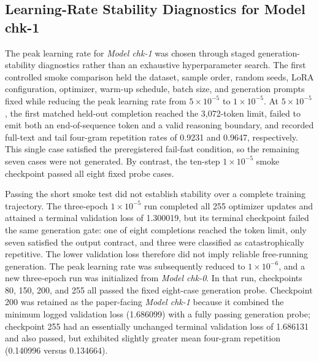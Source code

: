\subsection*{Learning-Rate Stability Diagnostics for Model chk-1}
\label{app:chk1_lr_selection}

The peak learning rate for \textit{Model chk-1} was chosen through staged
generation-stability diagnostics rather than an exhaustive hyperparameter
search. The first controlled smoke comparison held the dataset, sample order,
random seeds, LoRA configuration, optimizer, warm-up schedule, batch size, and
generation prompts fixed while reducing the peak learning rate from
\(5\times10^{-5}\) to \(1\times10^{-5}\). At \(5\times10^{-5}\), the first
matched held-out completion reached the 3,072-token limit, failed to emit both
an end-of-sequence token and a valid reasoning boundary, and recorded full-text
and tail four-gram repetition rates of 0.9231 and 0.9647, respectively. This
single case satisfied the preregistered fail-fast condition, so the remaining
seven cases were not generated. By contrast, the ten-step
\(1\times10^{-5}\) smoke checkpoint passed all eight fixed probe cases.

Passing the short smoke test did not establish stability over a complete
training trajectory. The three-epoch \(1\times10^{-5}\) run completed all 255
optimizer updates and attained a terminal validation loss of 1.300019, but its
terminal checkpoint failed the same generation gate: one of eight completions
reached the token limit, only seven satisfied the output contract, and three
were classified as catastrophically repetitive. The lower validation loss
therefore did not imply reliable free-running generation. The peak learning
rate was subsequently reduced to \(1\times10^{-6}\), and a new three-epoch run
was initialized from \textit{Model chk-0}. In that run, checkpoints 80, 150,
200, and 255 all passed the fixed eight-case generation probe. Checkpoint 200
was retained as the paper-facing \textit{Model chk-1} because it combined the
minimum logged validation loss (1.686099) with a fully passing generation
probe; checkpoint 255 had an essentially unchanged terminal validation loss
of 1.686131 and also passed, but exhibited slightly greater mean four-gram
repetition (0.140996 versus 0.134664).

